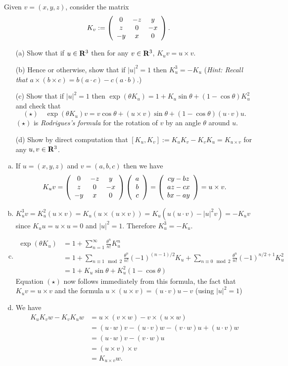 \documentclass[12pt]{article}
\begin{document}
\begin{question}
Given $v=(x,y,z)$, consider the matrix
\[K_v:=\left(\begin{array}{ccc}0 & -z & y\\z & 0 & -x\\-y & x & 0\end{array}\right).\]
\begin{enumerate}
\item[(a)] Show that if $u\in\mathbf{R}^3$ then for any $v\in\mathbf{R}^3$, $K_uv=u\times v$.
\item[(b)] Hence or otherwise, show that if $|u|^2=1$ then $K_u^3=-K_u$ ({\em Hint: Recall that $a\times(b\times c)=b(a\cdot c)-c(a\cdot b)$.})
\item[(c)] Show that if $|u|^2=1$ then $\exp(\theta K_u)=1+K_u\sin\theta+(1-\cos\theta)K_u^2$ and check that
\[(\star)\quad \exp(\theta K_u)v=v\cos\theta+(u\times v)\sin\theta+(1-\cos\theta)(u\cdot v)u.\]
$(\star)$ is {\em Rodrigues's formula} for the rotation of $v$ by an angle $\theta$ around $u$.
\item[(d)] Show by direct computation that $[K_u,K_v]:=K_uK_v-K_vK_u=K_{u\times v}$ for any $u,v\in\mathbf{R}^3$.
\end{enumerate}
\end{question}
\bigskip

\begin{answer}
\begin{enumerate}[(a)]
\item If $u=(x,y,z)$ and $v=(a,b,c)$ then we have
\[K_uv=\left(\begin{array}{ccc}0 & -z & y\\z & 0 & -x\\-y & x & 0\end{array}\right)\left(\begin{array}{c}a \\ b \\ c\end{array}\right)=\left(\begin{array}{c}cy-bz \\ az-cx \\ bx-ay\end{array}\right)=u\times v.\]
\item $K_u^3v=K_u^2(u\times v)=K_u(u\times(u\times v))=K_u(u(u\cdot v)-|u|^2v)=-K_uv$ since $K_uu=u\times u=0$ and $|u|^2=1$. Therefore $K_u^3=-K_u$.
\item \begin{align*}
\exp(\theta K_u)&=1+\sum_{n=1}^{\infty}\frac{\theta^n}{n!}K_u^n\\
                &=1+\sum_{n\equiv 1\mod 2}\frac{\theta^n}{n!}(-1)^{(n-1)/2}K_u+\sum_{n\equiv 0\mod 2}\frac{\theta^n}{n!}(-1)^{n/2+1}K_u^2\\
                &=1+K_u\sin\theta+K_u^2(1-\cos\theta)
\end{align*}
Equation $(\star)$ now follows immediately from this formula, the fact that $K_uv=u\times v$ and the formula $u\times (u\times v)=(u\cdot v)u-v$ (using $|u|^2=1$)
\item We have
\begin{align*}
K_uK_vw-K_vK_uw&=u\times(v\times w)-v\times (u\times w)\\
              &=(u\cdot w)v-(u\cdot v)w-(v\cdot w)u+(u\cdot v)w\\
              &=(u\cdot w)v-(v\cdot w)u\\
              &=(u\times v)\times v\\
              &=K_{u\times v}w.
\end{align*}
\end{enumerate}
\end{answer}
\end{document}
